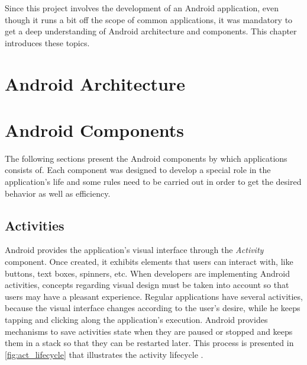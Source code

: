 Since this project involves the development of an Android application, even though it runs a bit off the scope of common applications, it was mandatory to get a deep understanding of Android architecture and components. This chapter introduces these topics.

\section{Android Architecture}
\label{sec:android_architecture}



\section{Android Components}

The following sections present the Android components by which applications consists of. Each component was designed to develop a special role in the application's life and some rules need to be carried out in order to get the desired behavior as well as efficiency. 

\subsection{Activities}

Android provides the application's visual interface through the \textit{Activity} component. Once created, it exhibits elements that users can interact with, like buttons, text boxes, spinners, etc. When developers are implementing Android activities, concepts regarding visual design must be taken into account so that users may have a pleasant experience. Regular applications have several activities, because the visual interface changes according to the user's desire, while he keeps tapping and clicking along the application's execution. Android provides mechanisms to save activities state when they are paused or stopped and keeps them in a stack so that they can be restarted later. This process is presented in \autoref{fig:act_lifecycle} that illustrates the activity lifecycle \cite{Activity:Android}.

